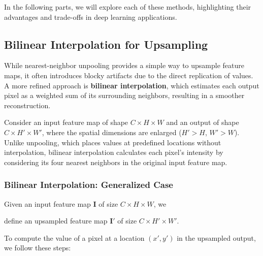 \noindent In the following parts, we will explore each of these methods, highlighting their advantages and trade-offs in deep learning applications.

\subsection{Bilinear Interpolation for Upsampling}

\noindent While nearest-neighbor unpooling provides a simple way to upsample feature maps, it often introduces blocky artifacts due to the direct replication of values. A more refined approach is \textbf{bilinear interpolation}, which estimates each output pixel as a weighted sum of its surrounding neighbors, resulting in a smoother reconstruction.

\noindent Consider an input feature map of shape $C \times H \times W$ and an output of shape $C \times H' \times W'$, where the spatial dimensions are enlarged ($H' > H$, $W' > W$). Unlike unpooling, which places values at predefined locations without interpolation, bilinear interpolation calculates each pixel's intensity by considering its four nearest neighbors in the original input feature map. 

\subsubsection{Bilinear Interpolation: Generalized Case} \noindent Given an input feature map $\mathbf{I}$ of size $C \times H \times W$, we 

define an upsampled feature map $\mathbf{I'}$ of size $C \times H' \times W'$.

\newpage

To compute the value of a pixel at a location $(x', y')$ in the upsampled output, we follow these steps: 

